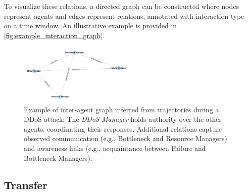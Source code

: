 To visualize these relations, a directed graph can be constructed where nodes represent agents and edges represent relations, annotated with interaction type on a time window. An illustrative example is provided in \autoref{fig:example_interaction_graph}.

\begin{figure}[h!]
  \centering
  \includegraphics[trim=0cm 2cm 0cm 2cm, clip, width=0.5\textwidth]{figures/roles_graph.pdf}
  \caption{Example of inter-agent graph inferred from trajectories during a DDoS attack: The \textit{DDoS Manager} holds authority over the other agents, coordinating their responses. Additional relations capture observed communication (e.g., Bottleneck and Resource Managers) and awareness links (e.g., acquaintance between Failure and Bottleneck Managers).}
  \label{fig:example_interaction_graph}
\end{figure}





\subsection{Transfer}
\label{sec:transfer}


